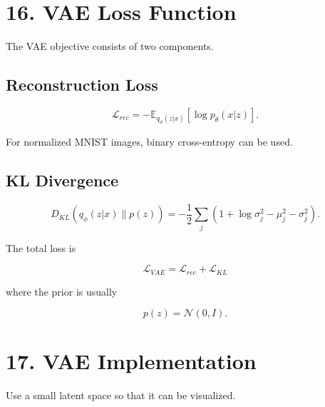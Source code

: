 \documentclass[10pt]{article}
\begin{document}
\begin{center}
\end{center}

\section*{16. VAE Loss Function}

The VAE objective consists of two components.

\subsection*{Reconstruction Loss}

\[
\mathcal{L}_{rec}
=
-\mathbb{E}_{q_{\phi}(z|x)}
[\log p_{\theta}(x|z)].
\]

For normalized MNIST images, binary cross-entropy can be used.

\subsection*{KL Divergence}

\[
D_{KL}
\left(
q_{\phi}(z|x)\parallel p(z)
\right)
=
-\frac{1}{2}
\sum_j
\left(
1+\log\sigma_j^2-\mu_j^2-\sigma_j^2
\right).
\]

The total loss is

\[
\boxed{
\mathcal{L}_{VAE}
=
\mathcal{L}_{rec}
+
\mathcal{L}_{KL}
}
\]

where the prior is usually

\[
p(z)=\mathcal{N}(0,I).
\]

\section*{17. VAE Implementation}

Use a small latent space so that it can be visualized.
\end{document}
